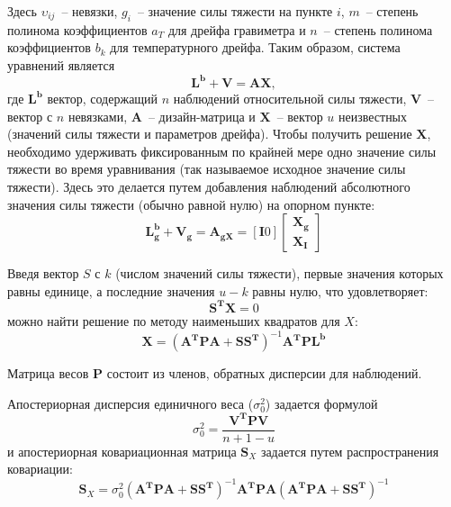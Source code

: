 Здесь $\upsilon_{ij}$~-- невязки, $g_i$~-- значение силы тяжести на пункте $i$,
$m$~-- степень полинома коэффициентов $a_T$ для дрейфа гравиметра и $n$~--
степень полинома коэффициентов $b_k$ для температурного дрейфа. Таким образом,
система уравнений является
\begin{equation}
    \mathbf{L}^{\mathbf{b}} + \mathbf{V} = \mathbf{A}\mathbf{X},
\end{equation}
где $\mathbf{L}^{\mathbf{b}}$ вектор, содержащий $n$ наблюдений относительной
силы тяжести, $\mathbf{V}$~-- вектор с $n$ невязками, $\mathbf{A}$~--
дизайн-матрица и $\mathbf{X}$~-- вектор $u$ неизвестных (значений силы тяжести и
параметров дрейфа). Чтобы получить решение $\mathbf{X}$, необходимо удерживать
фиксированным по крайней мере одно значение силы тяжести во время уравнивания
(так называемое исходное значение силы тяжести). Здесь это делается путем
добавления наблюдений абсолютного значения силы тяжести (обычно равной нулю) на
опорном пункте:
\begin{equation}
    \mathbf{L}^{\mathbf{b}}_{\mathbf{g}} + \mathbf{V}_{\mathbf{g}} =
    \mathbf{A}_{\mathbf{g}\mathbf{X}} =
    \left[\mathbf{I}0\right]
    \left[
        \begin{aligned}
            \mathbf{X}_{\mathbf{g}}\\
            \mathbf{X}_{\mathbf{I}}
        \end{aligned}
    \right]
\end{equation}

Введя вектор $S$ с $k$ (числом значений силы тяжести), первые значения которых равны
единице, а последние значения $u-k$ равны нулю, что удовлетворяет:
\begin{equation}
    \mathbf{S}^{\mathbf{T}}\mathbf{X}=0
\end{equation}
можно найти решение по методу наименьших квадратов для $X$:
\begin{equation}
    \mathbf{X} = \left(\mathbf{A}^{\mathbf{T}}\mathbf{P}\mathbf{A} + \mathbf{S}\mathbf{S}^{\mathbf{T}}\right)^{-1}\mathbf{A}^{\mathbf{T}}\mathbf{P}\mathbf{L}^{\mathbf{b}}
\end{equation}

Матрица весов $\mathbf{P}$ состоит из членов, обратных дисперсии для наблюдений.

Апостериорная дисперсия единичного веса ($\sigma^2_0$) задается формулой
\begin{equation}
    \sigma^2_0 = \frac{\mathbf{V}^{\mathbf{T}}\mathbf{P}\mathbf{V}}{n+1-u}
\end{equation}
и апостериорная ковариационная матрица $\mathbf{S}_X$ задается путем
распространения ковариации:
\begin{equation}
    \mathbf{S}_X = \sigma^2_0\left(\mathbf{A}^{\mathbf{T}}\mathbf{P}\mathbf{A}+\mathbf{S}\mathbf{S}^{\mathbf{T}}\right)^{-1}
    \mathbf{A}^{\mathbf{T}}\mathbf{P}\mathbf{A}\left(\mathbf{A}^{\mathbf{T}}\mathbf{P}\mathbf{A}+\mathbf{S}\mathbf{S}^{\mathbf{T}}\right)^{-1}
\end{equation}

